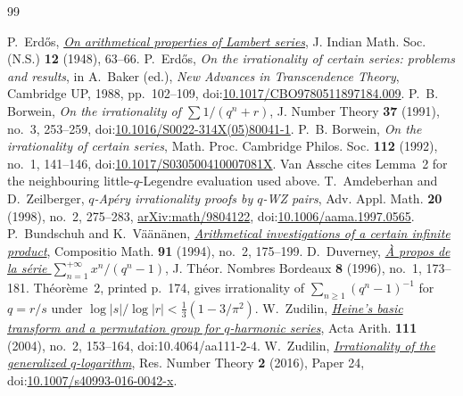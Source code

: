 \documentclass[11pt]{article}
\begin{document}
\begin{thebibliography}{99}
\small
\raggedright
\setlength{\itemsep}{0pt}
 P.~Erd\H{o}s,
  \href{https://users.renyi.hu/~p_erdos/1948-04.pdf}{\emph{On arithmetical
  properties of Lambert series}},
  J. Indian Math. Soc. (N.S.) \textbf{12} (1948), 63--66.
 P.~Erd\H{o}s, \emph{On the irrationality of certain series:
  problems and results}, in A.~Baker (ed.), \emph{New Advances in Transcendence
  Theory}, Cambridge UP, 1988, pp.~102--109,
  doi:\href{https://doi.org/10.1017/CBO9780511897184.009}{10.1017/CBO9780511897184.009}.
 P.~B. Borwein, \emph{On the irrationality of
  $\sum1/(q^{n}+r)$},
  J. Number Theory \textbf{37} (1991), no.~3, 253--259,
  doi:\href{https://doi.org/10.1016/S0022-314X(05)80041-1}{10.1016/S0022-314X(05)80041-1}.
 P.~B. Borwein, \emph{On the irrationality of certain
  series}, Math. Proc. Cambridge Philos. Soc. \textbf{112} (1992), no.~1,
  141--146,
  doi:\href{https://doi.org/10.1017/S030500410007081X}{10.1017/S030500410007081X}.
  Van Assche cites Lemma~2 for the neighbouring little-$q$-Legendre
  evaluation used above.
 T.~Amdeberhan and D.~Zeilberger, \emph{$q$-Ap\'ery
  irrationality proofs by $q$-WZ pairs}, Adv. Appl. Math. \textbf{20} (1998),
  no.~2, 275--283,
  \href{https://arxiv.org/abs/math/9804122}{arXiv:math/9804122},
  doi:\href{https://doi.org/10.1006/aama.1997.0565}{10.1006/aama.1997.0565}.
 P.~Bundschuh and K.~V\"a\"an\"anen,
  \href{https://numdam.org/item/CM_1994__91_2_175_0.pdf}{\emph{Arithmetical
  investigations of a certain infinite product}},
  Compositio Math. \textbf{91} (1994), no.~2, 175--199.
 D.~Duverney,
  \href{https://numdam.org/item/JTNB_1996__8_1_173_0.pdf}{\emph{\`A propos de la
  s\'erie $\sum_{n=1}^{+\infty}x^n/(q^n-1)$}},
  J. Th\'eor. Nombres Bordeaux \textbf{8} (1996), no.~1, 173--181.
  Th\'eor\`eme~2, printed p.~174, gives irrationality of
  $\sum_{n\ge1}(q^n-1)^{-1}$ for $q=r/s$ under
  $\log|s|/\log|r|<\tfrac13(1-3/\pi^2)$.
 W.~Zudilin,
  \href{https://geodesic.mathdoc.fr/articles/10.4064/aa111-2-4/}{\emph{Heine's
  basic transform and a permutation group for \(q\)-harmonic series}},
  Acta Arith. \textbf{111} (2004), no.~2, 153--164,
  doi:10.4064/aa111-2-4.
 W.~Zudilin,
  \href{https://arxiv.org/abs/1601.02688}{\emph{Irrationality of the generalized
  \(q\)-logarithm}}, Res. Number Theory \textbf{2} (2016), Paper 24,
  doi:\href{https://doi.org/10.1007/s40993-016-0042-x}{10.1007/s40993-016-0042-x}.

\end{thebibliography}
\end{document}
